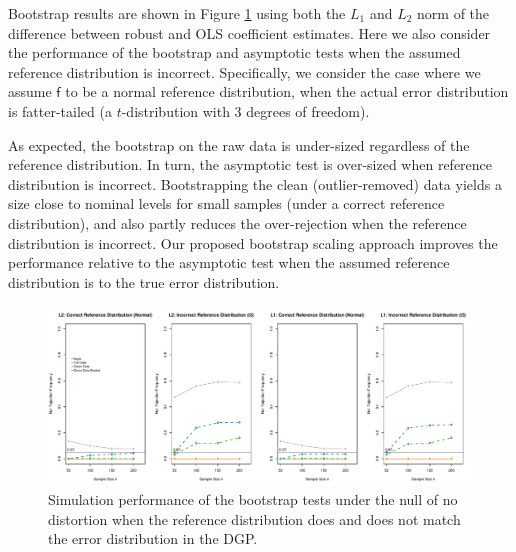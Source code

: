 \documentclass[11pt, letterpaper]{article}
\numberwithin{algorithm}{section}
\numberwithin{assumption}{section}
\numberwithin{lemma}{section}
\numberwithin{theorem}{section}
\numberwithin{corollary}{section}
\numberwithin{remark}{section}
\numberwithin{equation}{section}
\numberwithin{figure}{section}
\numberwithin{table}{section}
\begin{document}

Bootstrap results are shown in Figure \ref{fig_boot_sim_null} using both the $L_{1}$ and $L_{2}$ norm of the difference between robust and OLS coefficient estimates. Here we also consider the performance of the bootstrap and asymptotic tests when the assumed reference distribution is incorrect. Specifically, we consider the case where we assume $\mathsf{f}$ to be a normal reference distribution, when the actual error distribution is fatter-tailed (a $t$-distribution with 3 degrees of freedom).

As expected, the bootstrap on the raw data is under-sized regardless of the reference distribution. In turn, the asymptotic test is over-sized when reference distribution is incorrect. Bootstrapping the clean (outlier-removed) data yields a size close to nominal levels for small samples (under a correct reference distribution), and also partly reduces the over-rejection when the reference distribution is incorrect. Our proposed bootstrap scaling approach improves the performance relative to the asymptotic test when the assumed reference distribution is to the true error distribution.


\begin{figure}[!htbp]  %
\centering
\includegraphics[scale=0.5]{boot_null.pdf}
\caption{Simulation performance of the bootstrap tests under the null of no distortion when the reference distribution does and does not match the error distribution in the DGP.}
\label{fig_boot_sim_null}
\end{figure}
\end{document}
